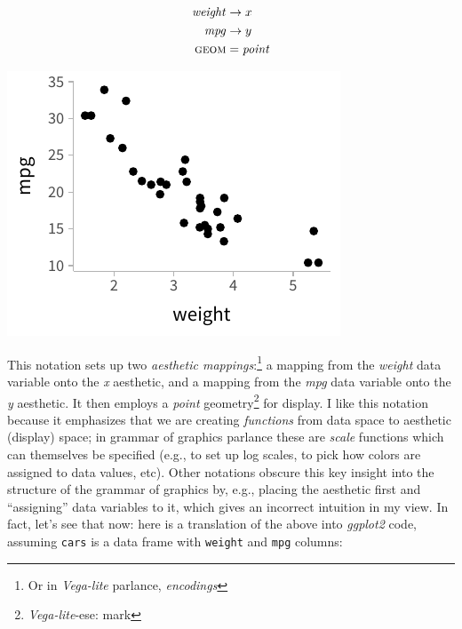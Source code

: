 \documentclass[journal]{vgtc}                     %
\begin{document}
\hfill\break
\noindent
  \begin{minipage}{.5\columnwidth}
    \begin{align*}
\mathit{weight} &\rightarrow x\\
\mathit{mpg} &\rightarrow y\\
\textsc{geom} &= \mathit{point}
\end{align*}
  \end{minipage}%
  \begin{minipage}{.4\columnwidth}
    \centering
    \includegraphics[width=1.2\columnwidth]{figs/2-mpg_v_weight.pdf}
  \end{minipage}


This notation sets up two \textit{aesthetic mappings}:\footnote{Or in \textit{Vega-lite} parlance, \textit{encodings}} a mapping from the \textit{weight} data variable onto the \textit{x} aesthetic, and a mapping from the \textit{mpg} data variable onto the \textit{y} aesthetic. It then employs a \textit{point} geometry\footnote{\textit{Vega-lite}-ese: mark} for display. I like this notation because it emphasizes that we are creating \textit{functions} from data space to aesthetic (display) space; in grammar of graphics parlance these are \textit{scale} functions which can themselves be specified (e.g., to set up log scales, to pick how colors are assigned to data values, etc). Other notations obscure this key insight into the structure of the grammar of graphics by, e.g., placing the aesthetic first and ``assigning'' data variables to it, which gives an incorrect intuition in my view. In fact, let's see that now: here is a translation of the above into \textit{ggplot2} code, assuming \texttt{cars} is a data frame with \texttt{weight} and \texttt{mpg} columns:
\end{document}
